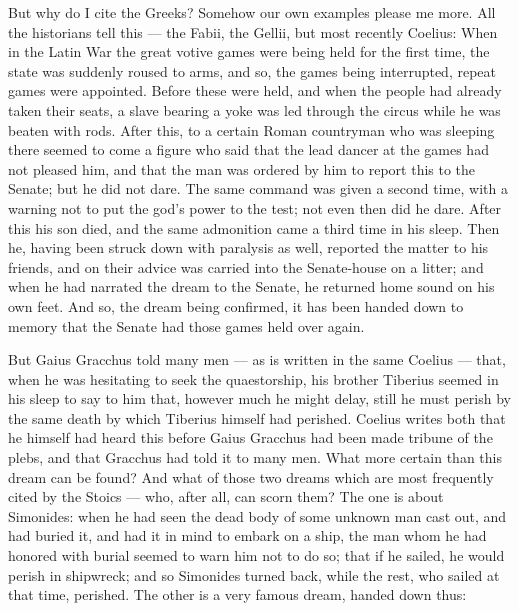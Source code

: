  But why do I cite the Greeks? Somehow our own examples please me more. All the historians tell this — the Fabii, the Gellii, but most recently Coelius: When in the Latin War the great votive games were being held for the first time, the state was suddenly roused to arms, and so, the games being interrupted, repeat games were appointed. Before these were held, and when the people had already taken their seats, a slave bearing a yoke was led through the circus while he was beaten with rods. After this, to a certain Roman countryman who was sleeping there seemed to come a figure who said that the lead dancer at the games had not pleased him, and that the man was ordered by him to report this to the Senate; but he did not dare. The same command was given a second time, with a warning not to put the god's power to the test; not even then did he dare. After this his son died, and the same admonition came a third time in his sleep. Then he, having been struck down with paralysis as well, reported the matter to his friends, and on their advice was carried into the Senate-house on a litter; and when he had narrated the dream to the Senate, he returned home sound on his own feet. And so, the dream being confirmed, it has been handed down to memory that the Senate had those games held over again.

 But Gaius Gracchus told many men — as is written in the same Coelius — that, when he was hesitating to seek the quaestorship, his brother Tiberius seemed in his sleep to say to him that, however much he might delay, still he must perish by the same death by which Tiberius himself had perished. Coelius writes both that he himself had heard this before Gaius Gracchus had been made tribune of the plebs, and that Gracchus had told it to many men. What more certain than this dream can be found? And what of those two dreams which are most frequently cited by the Stoics — who, after all, can scorn them? The one is about Simonides: when he had seen the dead body of some unknown man cast out, and had buried it, and had it in mind to embark on a ship, the man whom he had honored with burial seemed to warn him not to do so; that if he sailed, he would perish in shipwreck; and so Simonides turned back, while the rest, who sailed at that time, perished. The other is a very famous dream, handed down thus:

